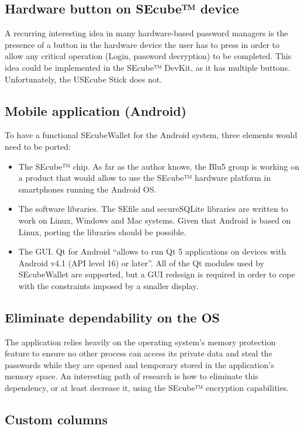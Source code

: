 \subsection{Hardware button on SEcube™ device}
A recurring interesting idea in many hardware-based password managers is the presence of a button in the hardware device the user has to press in order to allow any critical operation (Login, password decryption) to be completed. This idea could be implemented in the SEcube™ DevKit, as it has multiple buttons. Unfortunately, the USEcube Stick does not.

\subsection{Mobile application (Android)}
To have a functional SEcubeWallet for the Android system, three elements would need to be ported:
\begin{itemize}
\item The SEcube™ chip. As far as the author knows, the Blu5 group is working on a product that would allow to use the SEcube™ hardware platform in smartphones running the Android OS.
\item The software libraries. The SEfile and secureSQLite libraries are written to work on Linux, Windows and Mac systems. Given that Android is based on Linux, porting the libraries should be possible.
\item The GUI. Qt for Android \cite{android} ``allows to run Qt 5 applications on devices with Android v4.1 (API level 16) or later''. All of the Qt modules used by SEcubeWallet are supported, but a GUI redesign is required in order to cope with the constraints imposed by a smaller display.
\end{itemize}

\subsection{Eliminate dependability on the OS}

The application relies heavily on the operating system's memory protection feature to ensure no other process can access its private data and steal the passwords while they are opened and temporary stored in the application's memory space. An interesting path of research is how to eliminate this dependency, or at least decrease it, using the SEcube™ encryption capabilities.

\subsection{Custom columns}

